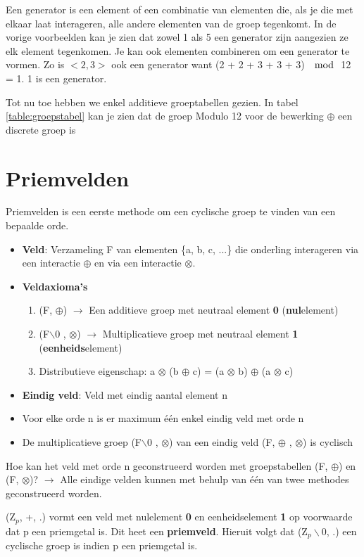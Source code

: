 \documentclass[12pt]{report}
\newcommand{\important}[1] {\textbf{\color{red}#1}}
\begin{document}
Een generator is een element of een combinatie van elementen die, als je die met elkaar laat interageren, alle andere elementen 
van de groep tegenkomt. In de vorige voorbeelden kan je zien dat zowel 1 als 5 een generator zijn aangezien ze elk element tegenkomen.
Je kan ook elementen combineren om een generator te vormen. Zo is $<2, 3>$ ook een generator want (2 + 2 + 3 + 3 + 3) $\mod$ 12 = 1. 
1 is een generator.

Tot nu toe hebben we enkel additieve groeptabellen gezien. In tabel \ref{table:groepstabel} kan je zien dat de groep Modulo 12 
voor de bewerking $\oplus$ een discrete groep is


\section{Priemvelden}
Priemvelden is een eerste methode om een cyclische groep te vinden van een bepaalde orde.
\begin{itemize}
 \item \important{Veld}: Verzameling F van elementen \{a, b, c, ...\} die onderling interageren via een interactie $\oplus$ en via 
een interactie $\otimes$.

 \item \important{Veldaxioma's}
  \begin{enumerate}
   \item (F, $\oplus$) $\rightarrow$ Een additieve groep met neutraal element \important{0} (\important{nul}element)
   \item (F$\backslash$0 , $\otimes$) $\rightarrow$ Multiplicatieve groep met neutraal element \important{1} 
   (\important{eenheids}element)
   \item Distributieve eigenschap: a $\otimes$ (b $\oplus$ c) = (a $\otimes$ b) $\oplus$ (a $\otimes$ c)
  \end{enumerate}
  \item \important{Eindig veld}: Veld met eindig aantal element n
  \item Voor elke orde n is er maximum één enkel eindig veld met orde n
  \item De multiplicatieve groep (F$\backslash$0 , $\otimes$) van een eindig veld (F, $\oplus$ , $\otimes$) is cyclisch
\end{itemize}
Hoe kan het veld met orde n geconstrueerd worden met groepstabellen (F, $\oplus$) en (F, $\otimes$)? $\rightarrow$ Alle eindige velden
kunnen met behulp van één van twee methodes geconstrueerd worden.

(Z$_p$, +, .) vormt een veld met nulelement \important{0} en eenheidselement \important{1} op voorwaarde dat p een priemgetal is. Dit heet een
\important{priemveld}. Hieruit volgt dat (Z$_p\backslash$0, .) een cyclische groep is indien p een priemgetal is.
\end{document}
